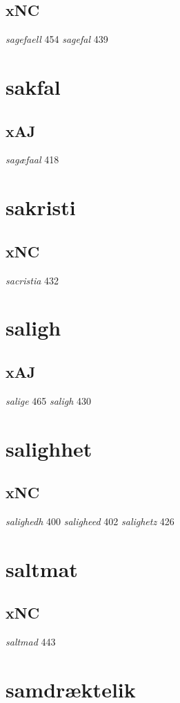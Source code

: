\documentclass[a4paper,twocolumn]{article}
\begin{document}
\subsection{xNC}
\label{sec:org3bdb4d9}
\emph{sagefaell} 454 \emph{sagefal} 439 
\section{sakfal}
\label{sec:orgdba98cf}
\subsection{xAJ}
\label{sec:org2ffec2b}
\emph{sagæfaal} 418 
\section{sakristi}
\label{sec:org63f97bc}
\subsection{xNC}
\label{sec:org877682d}
\emph{sacristia} 432 
\section{saligh}
\label{sec:org33093cd}
\subsection{xAJ}
\label{sec:org6ea2ac0}
\emph{salige} 465 \emph{saligh} 430 
\section{salighhet}
\label{sec:org8e0ba48}
\subsection{xNC}
\label{sec:orgda4a813}
\emph{salighedh} 400 \emph{saligheed} 402 \emph{salighetz} 426 
\section{saltmat}
\label{sec:org3009743}
\subsection{xNC}
\label{sec:org1c8366a}
\emph{saltmad} 443 
\section{samdræktelik}
\label{sec:org2081614}
\end{document}

